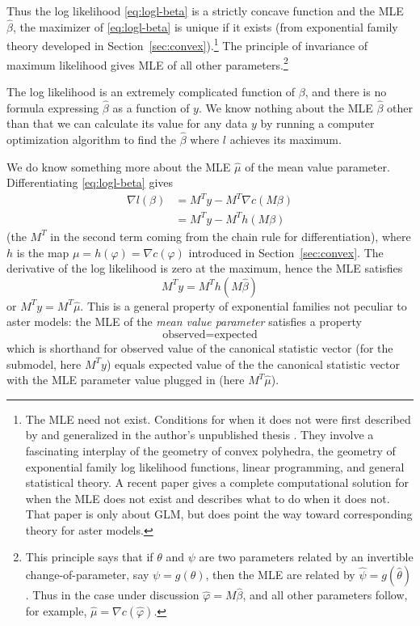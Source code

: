 \documentclass[11pt]{article}
\begin{document}
Thus the log likelihood \eqref{eq:logl-beta} is a strictly concave function
and the MLE $\hat{\beta}$, the maximizer of \eqref{eq:logl-beta} is unique
if it exists (from exponential family theory developed
in Section~\ref{sec:convex}).\footnote{The MLE need not exist.  Conditions
for when it does not were first described by \citet{barndorff-nielsen} and generalized
in the author's unpublished thesis \citep{geyer-thesis}.  They involve a fascinating
interplay of the geometry of convex polyhedra, the geometry of exponential
family log likelihood functions, linear programming, and general statistical
theory.  A recent paper \citep{geyer-gdor} gives a complete computational solution
for when the MLE does not exist and describes what to do when it does not.
That paper is only about GLM, but does point the way toward corresponding
theory for aster models.\label{foot:barndorff-complete}}
The principle of invariance of maximum likelihood gives MLE
of all other parameters.\footnote{This principle says that if $\theta$ and
$\psi$ are two parameters related by an invertible change-of-parameter,
say $\psi = g(\theta)$, then the MLE are related
by $\hat{\psi} = g(\hat{\theta})$.  Thus in the case under discussion
$\hat{\varphi} = M \hat{\beta}$, and all other parameters follow, for example,
$\hat{\mu} = \nabla c(\hat{\varphi})$.\label{foot:invariance}}

The log likelihood is an extremely complicated function of $\beta$, and
there is no formula expressing $\hat{\beta}$ as a function of $y$.
We know nothing about the MLE $\hat{\beta}$
other than that we can calculate its value for any data $y$ by running
a computer optimization algorithm to find the $\hat{\beta}$ where $l$ achieves
its maximum.

We do know something more about the MLE $\hat{\mu}$ of the mean value
parameter.  Differentiating \eqref{eq:logl-beta} gives
\begin{align*}
   \nabla l(\beta)
   & =
   M^T y - M^T \nabla c(M \beta)
   \\
   & =
   M^T y - M^T h(M \beta)
\end{align*}
(the $M^T$ in the second term coming from the chain rule for differentiation),
where $h$ is the map $\mu = h(\varphi) = \nabla c(\varphi)$ introduced in
Section~\ref{sec:convex}.
The derivative of the log likelihood is zero at the maximum, hence the MLE
satisfies
$$
   M^T y = M^T h(M \hat{\beta})
$$
or $M^T y = M^T \hat{\mu}$.  This is a general property of exponential
families not peculiar to aster models: the MLE of
the \emph{mean value parameter} satisfies a property
$$
   \text{observed}
   =
   \text{expected}
$$
which is shorthand for observed value of the canonical statistic vector
(for the submodel, here $M^T y$) equals expected value of the the canonical
statistic vector
with the MLE parameter value plugged in (here $M^T \hat{\mu}$).
\end{document}

